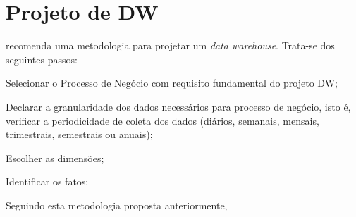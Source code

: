 \section{Projeto de DW}

 recomenda uma metodologia para projetar um
\textit{data warehouse}. Trata-se dos seguintes passos: \begin{inparaenum}[1)]
	\item Selecionar o Processo de Negócio com requisito fundamental do 
	projeto DW;
	\item Declarar a granularidade dos dados necessários para processo de 
	negócio, isto é, verificar a periodicidade de coleta dos dados (diários, semanais, mensais, trimestrais, semestrais ou anuais);
	\item Escolher as dimensões;
	\item Identificar os fatos;

\end{inparaenum} 

Seguindo esta metodologia proposta anteriormente,
